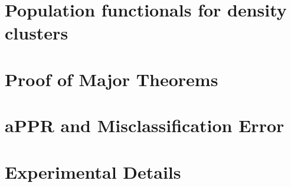 \documentclass{article}
\newcommand{\1}{\mathbf{1}}
\theoremstyle{definition}
\theoremstyle{remark}
\begin{document}
\section{Population functionals for density clusters}

\section{Proof of Major Theorems}
\label{sec:pf_major_theorems}

\section{aPPR and Misclassification Error}
\label{sec:appr_misclassification_error}

\section{Experimental Details}
\label{sec:experimental_details}

\clearpage

 
\end{document}
